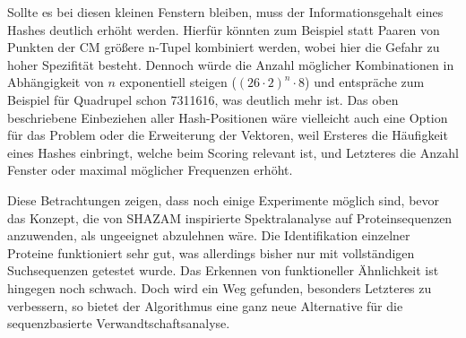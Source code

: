         Sollte es bei diesen kleinen Fenstern bleiben, muss der Informationsgehalt \autocite{shannon} eines Hashes deutlich erhöht werden. Hierfür könnten zum Beispiel statt Paaren von Punkten der \ac{CM} größere n-Tupel kombiniert werden, wobei hier die Gefahr zu hoher Spezifität besteht. Dennoch würde die Anzahl möglicher Kombinationen in Abhängigkeit von $n$ exponentiell steigen ($(26 \cdot 2)^{n}\cdot 8$) und entspräche zum Beispiel für Quadrupel schon 7311616, was deutlich mehr ist. Das oben beschriebene Einbeziehen aller Hash-Positionen wäre vielleicht auch eine Option für das Problem oder die Erweiterung der Vektoren, weil Ersteres die Häufigkeit eines Hashes einbringt, welche beim Scoring relevant ist, und Letzteres die Anzahl Fenster oder maximal möglicher Frequenzen erhöht.

        Diese Betrachtungen zeigen, dass noch einige Experimente möglich sind, bevor das Konzept, die von SHAZAM inspirierte Spektralanalyse auf  Proteinsequenzen anzuwenden, als ungeeignet abzulehnen wäre. Die Identifikation einzelner Proteine funktioniert sehr gut, was allerdings bisher nur mit vollständigen Suchsequenzen getestet wurde. Das Erkennen von funktioneller Ähnlichkeit ist hingegen noch schwach. Doch wird ein Weg gefunden, besonders Letzteres zu verbessern, so bietet der Algorithmus eine ganz neue Alternative für die sequenzbasierte Verwandtschaftsanalyse.
